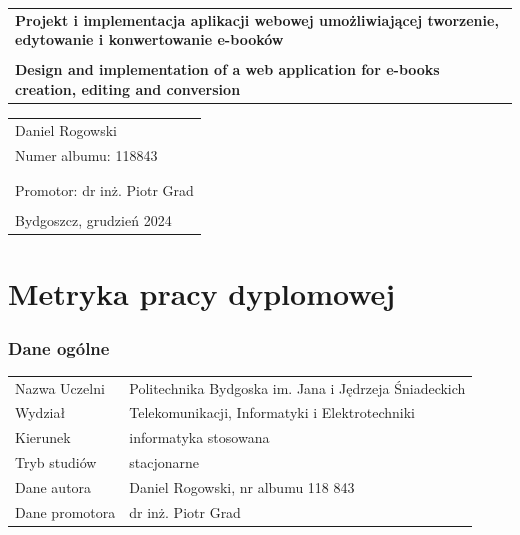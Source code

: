 \vfill


	\begin{tabular}{p{15cm}}
		\Large\bfseries
		\textbf{Projekt i implementacja aplikacji webowej umożliwiającej tworzenie, edytowanie i konwertowanie e-booków}\\
		\\
		\large\bfseries
		\textbf{Design and implementation of a web application for e-books creation, editing and conversion}\\
	\end{tabular}
   

\vfill
\begin{tabular}{l}
\Large Daniel Rogowski\\
Numer albumu: 118843\\
\\
\\
Promotor: dr inż. Piotr Grad\\
\\
    Bydgoszcz, grudzień 2024\\ %
\end{tabular}

\cleardoublepage





\pagestyle{plain}
\scriptsize

\section*{Metryka pracy dyplomowej}
\subsubsection*{Dane ogólne}
\begin{tabular}{p{3cm}p{12cm}}
Nazwa Uczelni & Politechnika Bydgoska im. Jana i Jędrzeja Śniadeckich\\
Wydział & Telekomunikacji, Informatyki i Elektrotechniki \\
Kierunek & informatyka stosowana\\
Tryb studiów & stacjonarne\\
Dane autora & Daniel Rogowski, nr albumu 118 843\\
Dane promotora & dr inż. Piotr Grad\\
\end{tabular}

